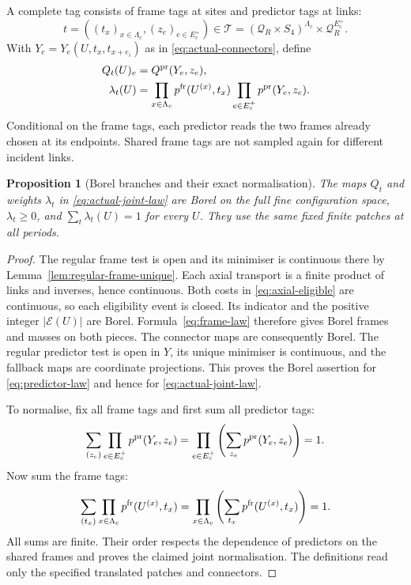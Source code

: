 \documentclass[11pt,reqno]{amsart}
\numberwithin{equation}{section}
\newtheorem{proposition}[theorem]{Proposition}
\theoremstyle{definition}
\theoremstyle{remark}
\begin{document}
A complete tag consists of frame tags at sites and predictor tags
at links:
\begin{equation}
       t=((t_x)_{x\in\Lambda_c},(z_e)_{e\in E_c^+})
       \in\mathcal T
       =(\mathcal Q_R\times S_4)^{\Lambda_c}
                                      \times\mathcal Q_R^{E_c^+}.
 \label{eq:complete-tag-space}
\end{equation}
With \(Y_e=Y_e(U,t_x,t_{x+e_i})\) as in
\eqref{eq:actual-connectors}, define
\begin{equation}
 \begin{split}
        Q_t(U)_e&=Q^{\rm pr}(Y_e,z_e),\\
        \lambda_t(U)&=
             \prod_{x\in\Lambda_c}p^{\rm fr}(U^{(x)},t_x)
             \prod_{e\in E_c^+}p^{\rm pr}(Y_e,z_e).
 \end{split}
 \label{eq:actual-joint-law}
\end{equation}
Conditional on the frame tags, each predictor reads the two frames
already chosen at its endpoints. Shared frame tags are not sampled
again for different incident links.

\begin{proposition}[Borel branches and their exact normalisation]
\label{prop:actual-branch-law}
The maps \(Q_t\) and weights \(\lambda_t\) in
\eqref{eq:actual-joint-law} are Borel on the full fine configuration
space, \(\lambda_t\ge0\), and \(\sum_t\lambda_t(U)=1\) for every
\(U\). They use the same fixed finite patches at all periods.
\end{proposition}
\begin{proof}
The regular frame test is open and its minimiser is continuous
there by Lemma~\ref{lem:regular-frame-unique}. Each axial
transport is a finite product of links and inverses, hence
continuous. Both costs in \eqref{eq:axial-eligible} are continuous,
so each eligibility event is closed. Its indicator and the positive
integer \(|\mathcal E(U)|\) are Borel. Formula~\eqref{eq:frame-law}
therefore gives Borel frames and masses on both pieces.
The connector maps are consequently Borel. The regular predictor
test is open in \(Y\), its unique minimiser is continuous, and
the fallback maps are coordinate projections. This proves the
Borel assertion for \eqref{eq:predictor-law} and hence for
\eqref{eq:actual-joint-law}.

To normalise, fix all frame tags and first sum all predictor tags:
\[
     \sum_{(z_e)}\prod_{e\in E_c^+}p^{\rm pr}(Y_e,z_e)
        =\prod_{e\in E_c^+}\left(\sum_{z_e}p^{\rm pr}(Y_e,z_e)\right)=1.
\]
Now sum the frame tags:
\[
       \sum_{(t_x)}\prod_{x\in\Lambda_c}p^{\rm fr}(U^{(x)},t_x)
        =\prod_{x\in\Lambda_c}\left(\sum_{t_x}p^{\rm fr}(U^{(x)},t_x)\right)=1.
\]
All sums are finite. Their order respects the dependence of
predictors on the shared frames and proves the claimed joint
normalisation. The definitions read only the specified translated
patches and connectors.
\end{proof}
\end{document}
